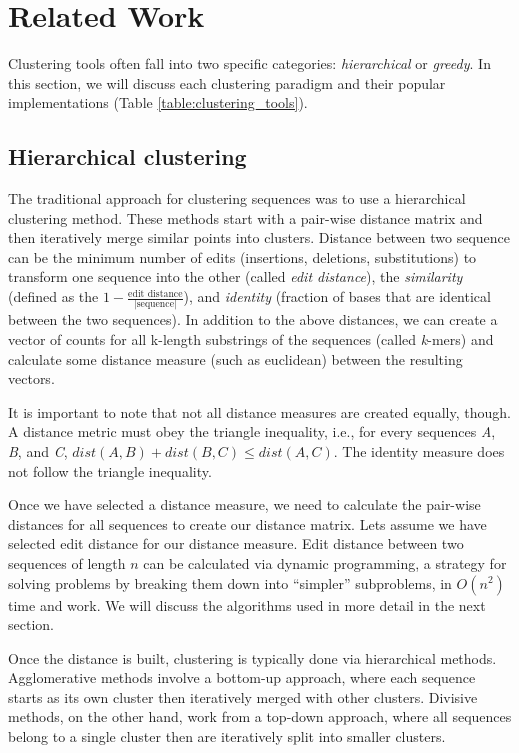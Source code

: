 \section{Related Work}

Clustering tools often fall into two specific categories: \emph{hierarchical} or \emph{greedy}.
In this section, we will discuss each clustering paradigm and their popular implementations (Table \ref{table:clustering_tools}).

\subsection{Hierarchical clustering}
The traditional approach for clustering sequences was to use a hierarchical clustering method.
These methods start with a pair-wise distance matrix and then iteratively merge similar points into clusters.
Distance between two sequence can be the minimum number of edits (insertions, deletions, substitutions) to transform one sequence into the other (called \emph{edit distance}), the \emph{similarity} (defined as the $1 - \frac{\text{edit distance}}{|\text{sequence}|}$), and \emph{identity} (fraction of bases that are identical between the two sequences).
In addition to the above distances, we can create a vector of counts for all k-length substrings of the sequences (called \emph{k}-mers) and calculate some distance measure (such as euclidean) between the resulting vectors.

It is important to note that not all distance measures are created equally, though.
A distance metric must obey the triangle inequality, i.e., for every sequences \emph{A}, \emph{B}, and \emph{C}, $dist(A,B) + dist(B,C) \leq dist(A,C)$.
The identity measure does not follow the triangle inequality.

Once we have selected a distance measure, we need to calculate the pair-wise distances for all sequences to create our distance matrix.
Lets assume we have selected edit distance for our distance measure.
Edit distance between two sequences of length $n$ can be calculated via dynamic programming, a strategy for solving problems by breaking them down into ``simpler'' subproblems, in $O(n^2)$ time and work.
We will discuss the algorithms used in more detail in the next section.

Once the distance  is built, clustering is typically done via hierarchical methods.
Agglomerative methods involve a bottom-up approach, where each sequence starts as its own cluster then iteratively merged with other clusters.
Divisive methods, on the other hand, work from a top-down approach, where all sequences belong to a single cluster then are iteratively split into smaller clusters.

